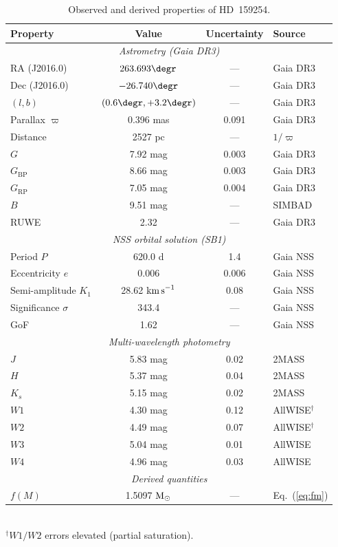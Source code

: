 \documentclass[usenatbib,fleqn]{mnras}
\newcommand{\Msun}{{\rm M}_\odot}
\newcommand{\kms}{{\rm km\,s}^{-1}}
\newcommand{\fmass}{f(M)}
\begin{document}
\begin{table}
\centering
\caption{Observed and derived properties of HD~159254.}
\label{tab:observed}
\begin{tabular}{lccl}
\toprule
Property & Value & Uncertainty & Source \\
\midrule
\multicolumn{4}{c}{\textit{Astrometry (Gaia DR3)}} \\
RA (J2016.0)           & $263.693\degr$      & ---      & Gaia DR3 \\
Dec (J2016.0)          & $-26.740\degr$      & ---      & Gaia DR3 \\
$(l, b)$               & $(0.6\degr, +3.2\degr)$ & --- & Gaia DR3 \\
Parallax $\varpi$      & 0.396 mas           & 0.091    & Gaia DR3 \\
Distance               & 2527 pc             & ---      & $1/\varpi$ \\
$G$                    & 7.92 mag            & 0.003    & Gaia DR3 \\
$G_\mathrm{BP}$        & 8.66 mag            & 0.003    & Gaia DR3 \\
$G_\mathrm{RP}$        & 7.05 mag            & 0.004    & Gaia DR3 \\
$B$                    & 9.51 mag            & ---      & SIMBAD \\
RUWE                   & 2.32                & ---      & Gaia DR3 \\
\midrule
\multicolumn{4}{c}{\textit{NSS orbital solution (SB1)}} \\
Period $P$             & 620.0 d             & 1.4      & Gaia NSS \\
Eccentricity $e$       & 0.006               & 0.006    & Gaia NSS \\
Semi-amplitude $K_1$   & 28.62 $\kms$        & 0.08     & Gaia NSS \\
Significance $\sigma$  & 343.4               & ---      & Gaia NSS \\
GoF                    & 1.62                & ---      & Gaia NSS \\
\midrule
\multicolumn{4}{c}{\textit{Multi-wavelength photometry}} \\
$J$   & 5.83 mag & 0.02 & 2MASS \\
$H$   & 5.37 mag & 0.04 & 2MASS \\
$K_s$ & 5.15 mag & 0.02 & 2MASS \\
$W1$  & 4.30 mag & 0.12 & AllWISE$^\dagger$ \\
$W2$  & 4.49 mag & 0.07 & AllWISE$^\dagger$ \\
$W3$  & 5.04 mag & 0.01 & AllWISE \\
$W4$  & 4.96 mag & 0.03 & AllWISE \\
\midrule
\multicolumn{4}{c}{\textit{Derived quantities}} \\
$\fmass$               & 1.5097 $\Msun$      & ---      & Eq.~(\ref{eq:fm}) \\
\bottomrule
\end{tabular}
\medskip\\
\footnotesize{$^\dagger$$W1/W2$ errors elevated (partial saturation).}
\end{table}
\end{document}
